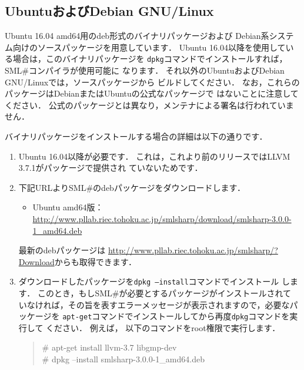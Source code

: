 \documentclass{jbook}
\newif\ifjp
\newcommand{\txt}[2]{#1}
\newcommand{\smlsharp}{SML\#}
\newcommand{\version}{3.0.0}
\newcommand\eurl[1]{{\edef\eurlTMP{{#1}}\expandafter\url\eurlTMP}}
\newenvironment{program}{\begin{quote}\begin{tt}}%
                        {\end{tt}\end{quote}}
\begin{document}
\fi%

\subsection{\txt{UbuntuおよびDebian GNU/Linux}{Ubuntu and Debian GNU/Linux}}
\ifjp%
	Ubuntu 16.04 amd64用のdeb形式のバイナリパッケージおよび
Debian系システム向けのソースパッケージを用意しています．
	Ubuntu 16.04以降を使用している場合は，このバイナリパッケージを
{\tt dpkg}コマンドでインストールすれば，\smlsharp{}コンパイラが使用可能に
なります．
	それ以外のUbuntuおよびDebian GNU/Linuxでは，ソースパッケージから
ビルドしてください．
	なお，これらのパッケージはDebianまたはUbuntuの公式なパッケージで
はないことに注意してください．
	公式のパッケージとは異なり，メンテナによる署名は行われていません．

	バイナリパッケージをインストールする場合の詳細は以下の通りです．
\begin{enumerate}
\item
	Ubuntu 16.04以降が必要です．
	これは，これより前のリリースではLLVM 3.7.1がパッケージで提供され
ていないためです．

\item
	下記URLより\smlsharp{}のdebパッケージをダウンロードします．
\begin{itemize}
\item Ubuntu amd64版：
\eurl{http://www.pllab.riec.tohoku.ac.jp/smlsharp/download/smlsharp-\version-1_amd64.deb}
\end{itemize}
	最新のdebパッケージは
\url{http://www.pllab.riec.tohoku.ac.jp/smlsharp/?Download}からも取得できます．
\item
	ダウンロードしたパッケージを{\tt dpkg --install}コマンドでインストール
します．
	このとき，もし\smlsharp{}が必要とするパッケージがインストールされて
いなければ，その旨を表すエラーメッセージが表示されますので，必要なパッケージを
{\tt apt-get}コマンドでインストールしてから再度{\tt dpkg}コマンドを実行して
ください．
	例えば，%
以下のコマンドをroot権限で実行します．
\begin{program}
\# apt-get install llvm-3.7 libgmp-dev\\
\# dpkg --install smlsharp-\version{}-1\_amd64.deb
\end{program}
\end{enumerate}
\end{document}
